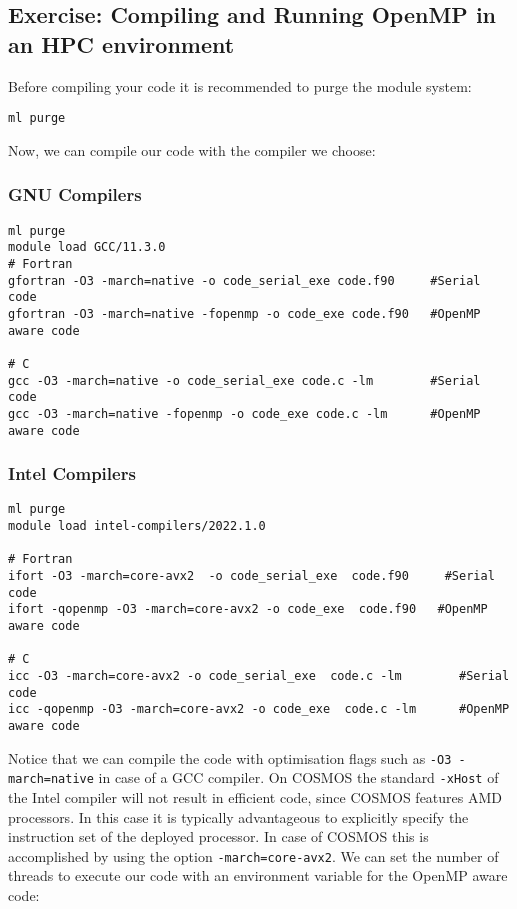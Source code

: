 \subsection{Exercise: Compiling and Running OpenMP in an HPC environment }

Before compiling your code it is recommended to purge the module system:

\begin{verbatim}
ml purge
\end{verbatim}

Now, we can compile our code with the compiler we choose:

\subsubsection{GNU Compilers}

\begin{verbatim}
ml purge
module load GCC/11.3.0
# Fortran
gfortran -O3 -march=native -o code_serial_exe code.f90     #Serial code
gfortran -O3 -march=native -fopenmp -o code_exe code.f90   #OpenMP aware code

# C
gcc -O3 -march=native -o code_serial_exe code.c -lm        #Serial code
gcc -O3 -march=native -fopenmp -o code_exe code.c -lm      #OpenMP aware code
\end{verbatim}

\subsubsection{Intel Compilers}

\begin{verbatim}
ml purge
module load intel-compilers/2022.1.0 

# Fortran
ifort -O3 -march=core-avx2  -o code_serial_exe  code.f90     #Serial code
ifort -qopenmp -O3 -march=core-avx2 -o code_exe  code.f90   #OpenMP aware code

# C
icc -O3 -march=core-avx2 -o code_serial_exe  code.c -lm        #Serial code
icc -qopenmp -O3 -march=core-avx2 -o code_exe  code.c -lm      #OpenMP aware code
\end{verbatim}

Notice that we can compile the code with optimisation flags such as \verb+-O3 -march=native+ in case of a GCC compiler.  On COSMOS the standard \verb+-xHost+ of the Intel compiler will not result in efficient code, since COSMOS features AMD processors.   In this case it is typically advantageous to explicitly specify the instruction set of the deployed processor.  In case of COSMOS this is accomplished by using the option \verb+-march=core-avx2+.  
We can set the number of threads to  execute our code with an environment variable
for the OpenMP aware code:

